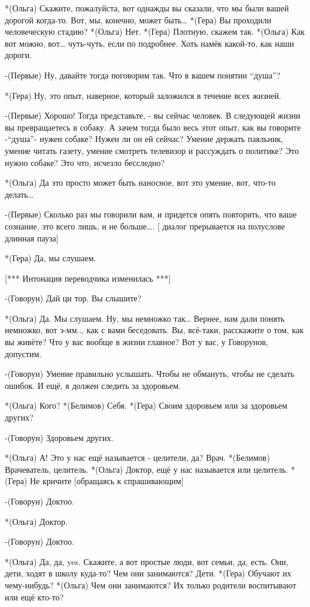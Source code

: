 *(Ольга) Скажите, пожалуйста, вот однажды вы сказали, что мы были вашей дорогой  когда-то. Вот, мы, конечно,  может быть…
*(Гера) Вы проходили человеческую стадию?
*(Ольга) Нет.
*(Гера) Плотную, скажем так.
*(Ольга) Как вот можно, вот… чуть-чуть, если по подробнее. Хоть намёк какой-то, как наши дороги.

-(Первые) Ну, давайте тогда поговорим так. Что в вашем понятии “душа”?

*(Гера) Ну, это опыт, наверное, который заложился  в течение всех жизней.

-(Первые) Хорошо! Тогда представьте, - вы сейчас человек. В следующей жизни вы превращаетесь в собаку. А зачем тогда было весь этот опыт, как вы говорите -“душа”- нужен собаке? Нужен ли он ей сейчас? Умение держать паяльник, умение читать газету, умение смотреть телевизор и рассуждать о политике? Это нужно собаке? Это что, исчезло бесследно? 

*(Ольга) Да это просто может быть наносное, вот это умение, вот, что-то делать…

-(Первые) Сколько раз мы говорили вам, и придется опять повторить, что ваше сознание, это всего лишь, и не больше….
[ диалог прерывается на полуслове длинная пауза]

*(Гера) Да, мы слушаем.

[*** Интонация переводчика изменилась ***]

-(Говорун) Дай ци тор. Вы слышите?

*(Ольга) Да. Мы слушаем. Ну, мы немножко так… Вернее, нам дали понять немножко, вот э-мм.., как с вами беседовать. Вы, всё-таки, расскажите о том, как вы живёте? Что у вас вообще в жизни главное? Вот у вас, у Говорунов, допустим. 

-(Говорун) Умение правильно услышать. Чтобы не обмануть, чтобы не сделать ошибок. И ещё, я должен следить за здоровьем.

*(Ольга) Кого?
*(Белимов) Себя.
*(Гера) Своим здоровьем или за здоровьем других?

-(Говорун) Здоровьем других.

*(Ольга) А! Это у нас ещё называется - целители, да? Врач.
*(Белимов) Врачеватель, целитель.
*(Ольга) Доктор, ещё у нас называется или целитель.
*(Гера) Не кричите [обращаясь к спрашивающим]

-(Говорун) Доктоо.

*(Ольга) Доктор.

-(Говорун) Доктоо.

*(Ольга) Да, да, yes. Скажите, а вот простые люди, вот семьи, да, есть. Они, дети, ходят в школу куда-то? Чем они занимаются? Дети.
*(Гера) Обучают их чему-нибудь?
*(Ольга) Чем они занимаются? Их только родители воспитывают или ещё кто-то?

